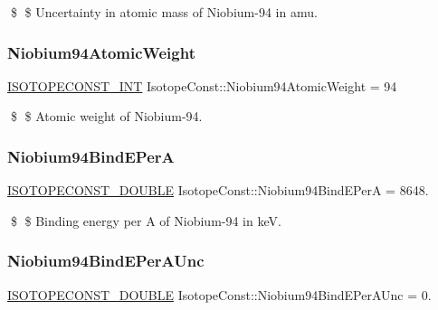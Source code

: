 \$ \$ Uncertainty in atomic mass of Niobium-\/94 in amu. \mbox{\label{group___isotope_const-_niobium-_nb94_gaede27eeae4a160ff07a826bf053885a1}} 
\subsubsection{\texorpdfstring{Niobium94\+Atomic\+Weight}{Niobium94AtomicWeight}}
{\footnotesize\ttfamily \mbox{\hyperlink{group___isotope_const-_macros_ga5f18360b3e99483a35c32d789e62621c}{I\+S\+O\+T\+O\+P\+E\+C\+O\+N\+S\+T\+\_\+\+I\+NT}} Isotope\+Const\+::\+Niobium94\+Atomic\+Weight = 94}

\$ \$ Atomic weight of Niobium-\/94. \mbox{\label{group___isotope_const-_niobium-_nb94_ga63964fd0e0d576fe387e572403d24007}} 
\subsubsection{\texorpdfstring{Niobium94\+Bind\+E\+PerA}{Niobium94BindEPerA}}
{\footnotesize\ttfamily \mbox{\hyperlink{group___isotope_const-_macros_ga8f45a7272ce02c0b4c65c44636ed719a}{I\+S\+O\+T\+O\+P\+E\+C\+O\+N\+S\+T\+\_\+\+D\+O\+U\+B\+LE}} Isotope\+Const\+::\+Niobium94\+Bind\+E\+PerA = 8648.}

\$ \$ Binding energy per A of Niobium-\/94 in keV. \mbox{\label{group___isotope_const-_niobium-_nb94_gafb55c37900031e720141d44d6053ea26}} 
\subsubsection{\texorpdfstring{Niobium94\+Bind\+E\+Per\+A\+Unc}{Niobium94BindEPerAUnc}}
{\footnotesize\ttfamily \mbox{\hyperlink{group___isotope_const-_macros_ga8f45a7272ce02c0b4c65c44636ed719a}{I\+S\+O\+T\+O\+P\+E\+C\+O\+N\+S\+T\+\_\+\+D\+O\+U\+B\+LE}} Isotope\+Const\+::\+Niobium94\+Bind\+E\+Per\+A\+Unc = 0.}

